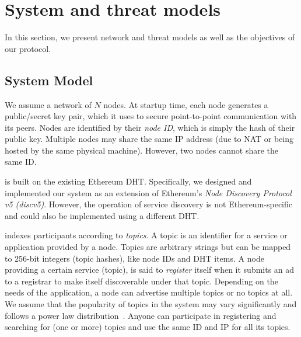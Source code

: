 
\section{System and threat models}
\label{sec:model}
In this section, we present \sysname network and threat models as well as the objectives of our protocol. 

\subsection{System Model}
We assume a network of $N$ nodes. At startup time, each node generates a public/secret key pair, which it uses to secure point-to-point communication with its peers. Nodes are identified by their \emph{node ID}, which is simply the hash of their public key. Multiple nodes may share the same IP address (due to NAT or being hosted by the same physical machine). However, two nodes cannot share the same ID.

\sysname is built on the existing Ethereum DHT. Specifically, we designed and implemented our system as an extension of Ethereum's \emph{Node Discovery Protocol v5 (discv5)}. However, the operation of service discovery is not Ethereum-specific and could also be implemented using a different DHT. 

\sysname indexes participants according to \emph{topics}. A topic is an identifier for a
service or application provided by a node. Topics are arbitrary strings but can be mapped to 256-bit integers (topic hashes), like node IDs and DHT items.
A node providing a certain service (topic), is said to \emph{register} itself when it submits an ad to a registrar  to make itself discoverable under that topic. Depending on the needs of the application, a node can advertise multiple topics or no topics at all. We assume that the popularity of topics in the system may vary significantly and follows a power law distribution~\cite{kim2018measuring}. Anyone can participate in registering and searching for (one or more) topics and use the same ID and IP for all its topics. 

